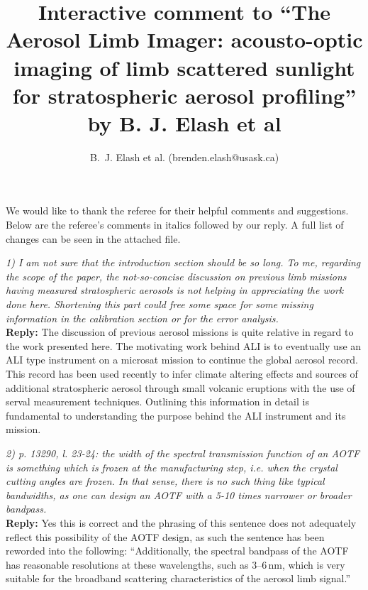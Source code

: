 \documentclass[12pt, notitlepage]{article}
\title{Interactive comment to ``The Aerosol Limb Imager: acousto-optic imaging of limb scattered
sunlight for stratospheric aerosol profiling'' by B. J. Elash et al}
\author{B.~J. Elash et al. (brenden.elash@usask.ca)}
\begin{document}
\begin{titlepage}
\maketitle
\end{titlepage}


We would like to thank the referee for their helpful comments and suggestions. Below are the referee's comments in italics followed by our reply. A full list of changes can be seen in the attached file.

\hrulefill

\textit{1) I am not sure that the introduction section should be so long. To me, regarding the
scope of the paper, the not-so-concise discussion on previous limb missions having
measured stratospheric aerosols is not helping in appreciating the work done here.
Shortening this part could free some space for some missing information in the calibration
section or for the error analysis.}\\

\textbf{Reply:} The discussion of previous aerosol missions is quite relative in regard to the work presented here. The motivating work behind ALI is to eventually use an ALI type instrument on a microsat mission to continue the global aerosol record. This record has been used recently to infer climate altering effects and sources of additional stratospheric aerosol through small volcanic eruptions with the use of serval measurement techniques. Outlining this information in detail is fundamental to understanding the purpose behind the ALI instrument and its mission.

\hrulefill

\textit{2) p. 13290, l. 23-24: the width of the spectral transmission function of an AOTF
is something which is frozen at the manufacturing step, i.e. when the crystal cutting
angles are frozen. In that sense, there is no such thing like typical bandwidths, as one
can design an AOTF with a 5-10 times narrower or broader bandpass.}\\

\textbf{Reply:} Yes this is correct and the phrasing of this sentence does not adequately reflect this possibility of the AOTF design, as such the sentence has been reworded into the following: ``Additionally, the spectral bandpass of the AOTF has reasonable resolutions at these wavelengths, such as 3--6\,nm, which is very suitable for the broadband scattering characteristics of the aerosol limb signal.''
\end{document}
